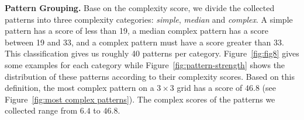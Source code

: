     \vspace{2mm}
    \noindent \textbf{Pattern Grouping.}
    Base on the complexity score, we divide the collected patterns into three complexity categories: \emph{simple}, \emph{median} and \emph{complex}. A simple pattern has a score of less than 19,
    a median
    complex pattern has a score between 19 and 33, and a complex pattern must have a score greater than 33. This classification gives us roughly 40 patterns per
    category. Figure~\ref{fig:fig8} gives some examples for each category while Figure~\ref{fig:pattern-strength} shows the distribution of these patterns according to their complexity scores.
    Based on this definition, the most complex pattern on a $3 \times 3$ grid has a score of $46.8$ (see Figure~\ref{fig:most complex patterns}).  The complex scores of the patterns we collected range from $6.4$ to $46.8$.

